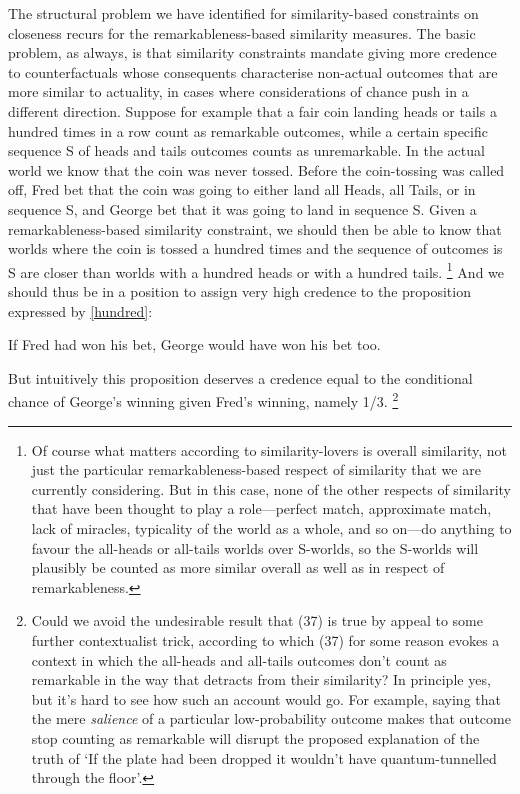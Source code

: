 \documentclass[leqno, 11pt, a5paper, openany]{article}
\begin{document}
The structural problem we have identified for similarity-based constraints on closeness recurs for the remarkableness-based similarity measures. The basic problem, as always, is that similarity constraints mandate giving more credence to counterfactuals whose consequents characterise non-actual outcomes that are more similar to actuality, in cases where considerations of chance push in a different direction. Suppose for example that a fair coin landing heads or tails a hundred times in a row count as remarkable outcomes, while a certain specific sequence S of heads and tails outcomes counts as unremarkable. In the actual world we know that the coin was never tossed. Before the coin-tossing was called off, Fred bet that the coin was going to either land all Heads, all Tails, or in sequence S, and George bet that it was going to land in sequence S. Given a remarkableness-based similarity constraint, we should then be able to know that worlds where the coin is tossed a hundred times and the sequence of outcomes is S are closer than worlds with a hundred heads or with a hundred tails.%
\footnote{Of course what matters according to similarity-lovers is overall similarity, not just the particular remarkableness-based respect of similarity that we are currently considering. But in this case, none of the other respects of similarity that have been thought to play a role---perfect match, approximate match, lack of miracles, typicality of the world as a whole, and so on---do anything to favour the all-heads or all-tails worlds over S-worlds, so the S-worlds will plausibly be counted as more similar overall as well as in respect of remarkableness.} 
And we should thus be in a position to assign very high credence to the proposition expressed by \ref{hundred}:
\begin{prop}
\nitem \label{hundred}
  If Fred had won his bet, George would have won his bet too.
\end{prop}
But intuitively this proposition deserves a credence equal to the conditional chance of George's winning given Fred's winning, namely 1/3.%
\footnote{Could we avoid the undesirable result that (37) is true by appeal to some further contextualist trick, according to which (37) for some reason evokes a context in which the all-heads and all-tails outcomes don't count as remarkable in the way that detracts from their similarity? In principle yes, but it's hard to see how such an account would go. For example, saying that the mere \emph{salience} of a particular low-probability outcome makes that outcome stop counting as remarkable will disrupt the proposed explanation of the truth of `If the plate had been dropped it wouldn't have quantum-tunnelled through the floor'.}
\end{document}
